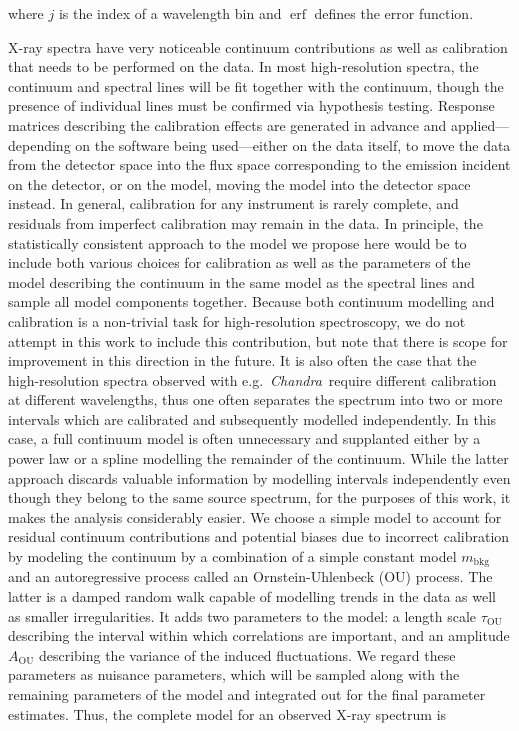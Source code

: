 \documentclass[12pt]{emulateapj}
\newcommand{\project}[1]{\textsl{#1}}
\newcommand{\chandra}{\project{Chandra}}
\newcommand{\mean}{m}
\DeclareMathOperator\erf{erf}
\begin{document}
\noindent where $j$ is the index of a wavelength bin and $\erf$ defines the error function. 

X-ray spectra have very noticeable continuum contributions as well as calibration that needs to be performed on the data. In most high-resolution spectra, the continuum and spectral lines will be fit together with the continuum, though the presence of individual lines must be confirmed via hypothesis testing. Response matrices describing the calibration effects are generated in advance and applied---depending on the software being used---either on the data itself, to move the data from the detector space into the flux space corresponding to the emission incident on the detector, or on the model, moving the model into the detector space instead. In general, calibration for any instrument is rarely complete, and residuals from imperfect calibration may remain in the data. 
In principle, the statistically consistent approach to the model we propose here would be to include both various choices for calibration as well as the parameters of the model describing the continuum in the same model as the spectral lines and sample all model components together. Because both continuum modelling and calibration is a non-trivial task for high-resolution spectroscopy, we do not attempt in this work to include this contribution, but note that there is scope for improvement in this direction in the future. %
It is also often the case that the high-resolution spectra observed with e.g.\ \chandra\ require different calibration at different wavelengths, thus one often separates the spectrum into two or more intervals which are calibrated and subsequently modelled independently. In this case, a full continuum model is often unnecessary and supplanted either by a power law or a spline modelling the remainder of the continuum. While the latter approach discards valuable information by modelling intervals independently even though they belong to the same source spectrum, for the purposes of this work, it makes the analysis considerably easier.
We choose a simple model to account for residual continuum contributions and potential biases due to incorrect calibration by modeling the continuum by a combination of a simple constant model $\mean_{\mathrm{bkg}}$ and an autoregressive process called an Ornstein-Uhlenbeck (OU) process. The latter is a damped random walk capable of modelling trends in the data as well as smaller irregularities. It adds two parameters to the model: a length scale $\tau_{\mathrm{OU}}$ describing the interval within which correlations are important, and an amplitude $A_{\mathrm{OU}}$ describing the variance of the induced fluctuations. 
We regard these parameters as nuisance parameters, which will be sampled along with the remaining parameters of the model and integrated out for the final parameter estimates. 
Thus, the complete model for an observed X-ray spectrum is
\end{document}
